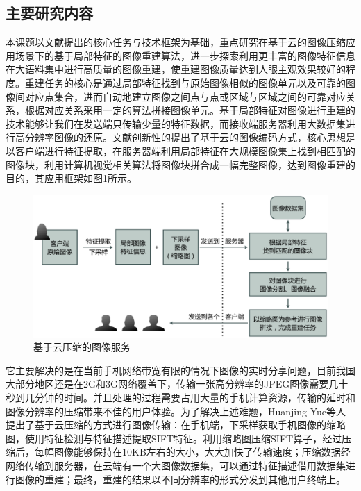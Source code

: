 \subsection{主要研究内容}

本课题以文献\cite{Yue:2013gl}提出的核心任务与技术框架为基础，重点研究在基于云的图像压缩应用场景下的基于局部特征的图像重建算法，进一步探索利用更丰富的图像特征信息在大语料集中进行高质量的图像重建，使重建图像质量达到人眼主观效果较好的程度。重建任务的核心是通过局部特征找到与原始图像相似的图像单元以及可靠的图像间对应点集合，进而自动地建立图像之间点与点或区域与区域之间的可靠对应关系，根据对应关系采用一定的算法拼接图像单元。基于局部特征对图像进行重建的技术能够让我们在发送端只传输少量的特征数据，而接收端服务器利用大数据集进行高分辨率图像的还原。文献\cite{Yue:2013gl}创新性的提出了基于云的图像编码方式，核心思想是以客户端进行特征提取，在服务器端利用局部特征在大规模图像集上找到相匹配的图像块，利用计算机视觉相关算法将图像块拼合成一幅完整图像，达到图像重建的目的，其应用框架如图\ref{fig:service}所示。

\begin{figure}
\centering\includegraphics[width=15cm]{imgs/ch1/service}
\caption{基于云压缩的图像服务}
\label{fig:service}
\end{figure}

它主要解决的是在当前手机网络带宽有限的情况下图像的实时分享问题，目前我国大部分地区还是在2G和3G网络覆盖下，传输一张高分辨率的JPEG图像需要几十秒到几分钟的时间。并且处理的过程需要占用大量的手机计算资源，传输的延时和图像分辨率的压缩带来不佳的用户体验。为了解决上述难题，Huanjing Yue等人提出了基于云压缩的方式进行图像传输：在手机端，下采样获取手机图像的缩略图，使用特征检测与特征描述提取SIFT特征。利用缩略图压缩SIFT算子，经过压缩后，每幅图像能够保持在10KB左右的大小，大大加快了传输速度；压缩数据经网络传输到服务器，在云端有一个大图像数据集，可以通过特征描述借用数据集进行图像的重建；最终，重建的结果以不同分辨率的形式分发到其他用户终端上。

